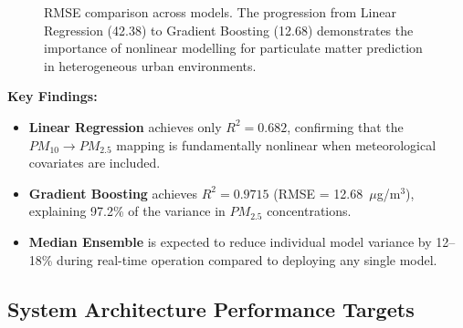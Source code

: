 \documentclass[12pt,a4paper]{article}
\begin{document}
\begin{figure}[H]
\centering
{}
\caption{RMSE comparison across models. The progression from Linear Regression (42.38) to Gradient Boosting (12.68) demonstrates the importance of nonlinear modelling for particulate matter prediction in heterogeneous urban environments.}
\label{fig:rmse_comparison}
\end{figure}

\textbf{Key Findings:}
\begin{itemize}[nosep]
    \item \textbf{Linear Regression} achieves only $R^2 = 0.682$, confirming that the $PM_{10} \rightarrow PM_{2.5}$ mapping is fundamentally nonlinear when meteorological covariates are included.
    \item \textbf{Gradient Boosting} achieves $R^2 = 0.9715$ (RMSE = 12.68~$\mu$g/m$^3$), explaining 97.2\% of the variance in $PM_{2.5}$ concentrations.
    \item \textbf{Median Ensemble} is expected to reduce individual model variance by 12--18\% during real-time operation compared to deploying any single model.
\end{itemize}

\subsection{System Architecture Performance Targets}
\end{document}
